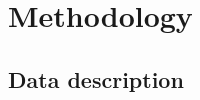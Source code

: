 \documentclass[format=sigconf, review=false, screen=true]{acmart}
\begin{document}


\section{Methodology}


\subsection{Data description}



\end{document}
